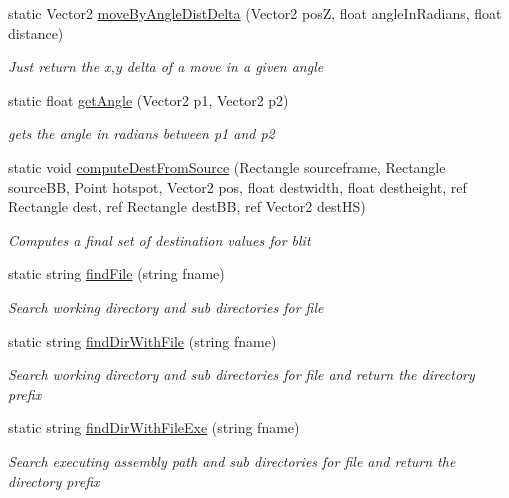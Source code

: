 \begin{DoxyCompactItemize}
static Vector2 \mbox{\hyperlink{class_r_c___framework_1_1_util_ac7ef00e1305fbdcdae04e73a3d48cdb2}{move\+By\+Angle\+Dist\+Delta}} (Vector2 posZ, float angle\+In\+Radians, float distance)
\begin{DoxyCompactList}\small\item\em Just return the x,y delta of a move in a given angle \end{DoxyCompactList}\item 
static float \mbox{\hyperlink{class_r_c___framework_1_1_util_a9c9049464e895bda2a1fc9789c526ed2}{get\+Angle}} (Vector2 p1, Vector2 p2)
\begin{DoxyCompactList}\small\item\em gets the angle in radians between p1 and p2 \end{DoxyCompactList}\item 
static void \mbox{\hyperlink{class_r_c___framework_1_1_util_aa1110dfd94a9f1963a560f4266f5db4e}{compute\+Dest\+From\+Source}} (Rectangle sourceframe, Rectangle source\+BB, Point hotspot, Vector2 pos, float destwidth, float destheight, ref Rectangle dest, ref Rectangle dest\+BB, ref Vector2 dest\+HS)
\begin{DoxyCompactList}\small\item\em Computes a final set of destination values for blit \end{DoxyCompactList}\item 
static string \mbox{\hyperlink{class_r_c___framework_1_1_util_a85009919b261b85302abf6f7bd1d02ce}{find\+File}} (string fname)
\begin{DoxyCompactList}\small\item\em Search working directory and sub directories for file \end{DoxyCompactList}\item 
static string \mbox{\hyperlink{class_r_c___framework_1_1_util_a554f5a1c79d41198bdc7314da7394c1d}{find\+Dir\+With\+File}} (string fname)
\begin{DoxyCompactList}\small\item\em Search working directory and sub directories for file and return the directory prefix \end{DoxyCompactList}\item 
static string \mbox{\hyperlink{class_r_c___framework_1_1_util_a3cb2180e25fa07003655a8f93d0d3d85}{find\+Dir\+With\+File\+Exe}} (string fname)
\begin{DoxyCompactList}\small\item\em Search executing assembly path and sub directories for file and return the directory prefix \end{DoxyCompactList}\item 

\end{DoxyCompactItemize}
